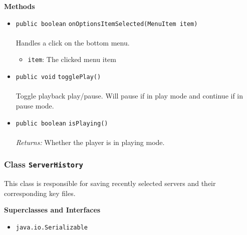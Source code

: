 \textbf{\sffamily Methods}
\begin{itemize}
\item \lstinline|public boolean| \lstinline|onOptionsItemSelected|\lstinline|(MenuItem item)|\\ \\[-0.6em]
Handles a click on the bottom menu.
\begin{itemize}
\item \lstinline|item|: The clicked menu item
\end{itemize}



\item \lstinline|public void| \lstinline|togglePlay|\lstinline|()|\\ \\[-0.6em]
Toggle playback play/pause. Will pause if in play mode and continue if
 in pause mode.



\item \lstinline|public boolean| \lstinline|isPlaying|\lstinline|()|\\ \\[-0.6em]
\emph{Returns:} Whether the player is in playing mode.



\end{itemize}

\subsubsection{Class \lstinline|ServerHistory|}
This class is responsible for saving recently selected servers
 and their corresponding key files. \\
\noindent\begin{minipage}[t]{5cm}
\vspace{0.3em}
\hspace*{2em}
\vspace{0.3em}
\end{minipage}



\textbf{\sffamily Superclasses and Interfaces}
\begin{itemize}
\item \lstinline|java.io.Serializable|
\end{itemize}



